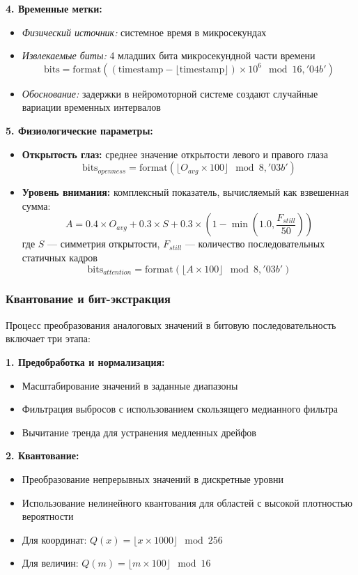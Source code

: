\documentclass[14pt, a4paper]{extreport}
\begin{document}
\textbf{4. Временные метки:}
\begin{itemize}
    \item \textit{Физический источник:} системное время в микросекундах
    \item \textit{Извлекаемые биты:} 4 младших бита микросекундной части времени
    $$\text{bits} = \text{format}((\text{timestamp} - \lfloor \text{timestamp} \rfloor) \times 10^6 \mod 16, '04b')$$
    \item \textit{Обоснование:} задержки в нейромоторной системе создают случайные вариации временных интервалов
\end{itemize}

\textbf{5. Физиологические параметры:}
\begin{itemize}
    \item \textbf{Открытость глаз:} среднее значение открытости левого и правого глаза
    $$\text{bits}_{openness} = \text{format}(\lfloor O_{avg} \times 100 \rfloor \mod 8, '03b')$$
    
    \item \textbf{Уровень внимания:} комплексный показатель, вычисляемый как взвешенная сумма:
    $$A = 0.4 \times O_{avg} + 0.3 \times S + 0.3 \times (1 - \min(1.0, \frac{F_{still}}{50}))$$
    где $S$ --- симметрия открытости, $F_{still}$ --- количество последовательных статичных кадров
    $$\text{bits}_{attention} = \text{format}(\lfloor A \times 100 \rfloor \mod 8, '03b')$$
\end{itemize}

\subsubsection{Квантование и бит-экстракция}

Процесс преобразования аналоговых значений в битовую последовательность включает три этапа:

\textbf{1. Предобработка и нормализация:}
\begin{itemize}
    \item Масштабирование значений в заданные диапазоны
    \item Фильтрация выбросов с использованием скользящего медианного фильтра
    \item Вычитание тренда для устранения медленных дрейфов
\end{itemize}

\textbf{2. Квантование:}
\begin{itemize}
    \item Преобразование непрерывных значений в дискретные уровни
    \item Использование нелинейного квантования для областей с высокой плотностью вероятности
    \item Для координат: $Q(x) = \lfloor x \times 1000 \rfloor \mod 256$
    \item Для величин: $Q(m) = \lfloor m \times 100 \rfloor \mod 16$
\end{itemize}
\end{document}
